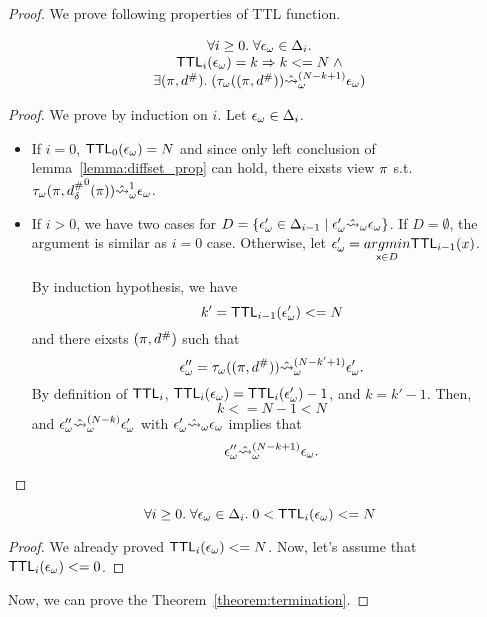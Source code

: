 \begin{proof}
We prove following properties of TTL function.
\begin{lemma}
  \[
    \begin{array}{c}
      \forall i \geq 0. \; \forall {\epsilon}_\omega \in \Delta_i. \\
      \textsf{TTL}_i({\epsilon}_\omega) = k \Rightarrow k <= N \; \wedge \\
      \exists (\pi, {d}^{\#}). \; ({\tau}_\omega((\pi,{d}^{\#}))
      \hat{\leadsto}_\omega^{(N - k + 1)} {\epsilon}_\omega) \\
    \end{array}
  \]
\end{lemma}
\begin{proof}
  We prove by induction on $i$.
  Let ${\epsilon}_\omega \in \Delta_i$.
  \begin{itemize}
  \item If $i = 0$, $\textsf{TTL}_0({\epsilon}_\omega) = N$
  and since only left conclusion of lemma~\ref{lemma:diffset_prop} can hold,
  there eixsts view $\pi$ s.t.
  ${\tau}_\omega(\pi, {{d}^{\#}_\delta}^0(\pi)) \hat{\leadsto}_\omega^1 {\epsilon}_\omega$.
  \item If $i > 0$, we have two cases for $D = 
    \{{\epsilon}_\omega' \in \Delta_{i-1} \mid {\epsilon}_\omega' \hat{\leadsto}_\omega {\epsilon}_\omega\}$.
  If $D = \emptyset$, the argument is similar as $i = 0$ case.
  Otherwise, let ${\epsilon}_\omega' = \underset{{\textsf{x}} \in D}{argmin}{\textsf{TTL}_{i-1}(x)}$.
  
  By induction hypothesis, we have
  \[
    k' = \textsf{TTL}_{i-1}({\epsilon}_\omega') <= N
  \]
  and there eixsts $(\pi, {d}^{\#})$ such that
  \[
    {\epsilon}_\omega'' = {\tau}_\omega((\pi,{d}^{\#})) \hat{\leadsto}_\omega^{(N - k' + 1)} {\epsilon}_\omega'.
  \]
  By definition of $\textsf{TTL}_i$,
  $\textsf{TTL}_i({\epsilon}_\omega) = \textsf{TTL}_i({\epsilon}_\omega') - 1$, and $k = k' - 1$.
  Then,
  \[
    k <= N - 1 < N
  \]
  and
  ${\epsilon}_\omega'' \hat{\leadsto}_\omega^{(N - k)} {\epsilon}_\omega'$ with
  ${\epsilon}_\omega' \hat{\leadsto}_\omega {\epsilon}_\omega$ implies that
  \[
    {\epsilon}_\omega'' \hat{\leadsto}_\omega^{(N - k + 1)} {\epsilon}_\omega.
  \]
  \end{itemize}
\end{proof}
\begin{corollary}
  \[
    \forall i \geq 0. \; \forall {\epsilon}_\omega \in \Delta_i. \;
    0 < \textsf{TTL}_i({\epsilon}_\omega) <= N
  \]
\end{corollary}
\begin{proof}
We already proved $\textsf{TTL}_i({\epsilon}_\omega) <= N$.
Now, let's assume that $\textsf{TTL}_i({\epsilon}_\omega) <= 0$.
\todo
\end{proof}

Now, we can prove the Theorem~\ref{theorem:termination}.
\todo

\end{proof}
